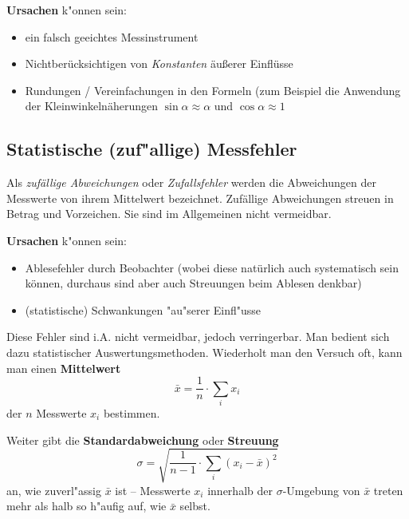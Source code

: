 \textbf{Ursachen} k"onnen sein:
\begin{itemize}
     \item ein falsch geeichtes Messinstrument
     \item Nichtberücksichtigen von \emph{Konstanten} äußerer Einflüsse
     \item Rundungen / Vereinfachungen in den Formeln (zum Beispiel die Anwendung der Kleinwinkelnäherungen $ \sin \alpha \approx \alpha $ und $ \cos \alpha \approx 1 $
\end{itemize}




\subsection{Statistische (zuf"allige) Messfehler}

\begin{Def}
   Als \emph{zufällige Abweichungen} oder \emph{Zufallsfehler} werden die Abweichungen der Messwerte von ihrem Mittelwert bezeichnet. 
   Zufällige Abweichungen streuen in Betrag und Vorzeichen. Sie sind im Allgemeinen nicht vermeidbar.
\end{Def}

\textbf{Ursachen} k"onnen sein:
\begin{itemize}
     \item Ablesefehler durch Beobachter (wobei diese natürlich auch systematisch sein können, durchaus sind aber auch Streuungen beim Ablesen denkbar)
     \item (statistische) Schwankungen "au"serer Einfl"usse
\end{itemize}

Diese Fehler sind i.A. nicht vermeidbar, jedoch verringerbar. Man
bedient sich dazu statistischer
Auswertungsmethoden. Wiederholt man den Versuch oft,
kann man einen \textbf{Mittelwert}
\begin{equation}
     \bar x = \frac{1}{n} \cdot \sum_i x_i
\end{equation}
der $n$ Messwerte $x_i$ bestimmen. 

Weiter gibt die \textbf{Standardabweichung} oder \textbf{Streuung}
\begin{equation}
     \sigma = \sqrt{\frac{1}{n-1} \cdot \sum_i (x_i - \bar x )^2}
\end{equation}
an, wie zuverl"assig $\bar x$ ist -- Messwerte $x_i$ innerhalb der
$\sigma$-Umgebung von $\bar x$ treten mehr als halb so h"aufig auf, wie
$\bar x$ selbst.

